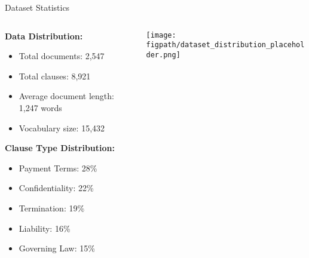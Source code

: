 \begin{frame}{Dataset Statistics}
\begin{columns}
\begin{column}{0.5\textwidth}
\textbf{Data Distribution:}
\begin{itemize}
    \item Total documents: 2,547
    \item Total clauses: 8,921
    \item Average document length: 1,247 words
    \item Vocabulary size: 15,432
\end{itemize}

\vspace{0.5cm}
\textbf{Clause Type Distribution:}
\begin{itemize}
    \item Payment Terms: 28\%
    \item Confidentiality: 22\%
    \item Termination: 19\%
    \item Liability: 16\%
    \item Governing Law: 15\%
\end{itemize}
\end{column}
\begin{column}{0.5\textwidth}
\begin{center}
\texttt{[image: \\figpath/dataset\_distribution\_placeholder.png]}
\end{center}
\end{column}
\end{columns}
\end{frame}

